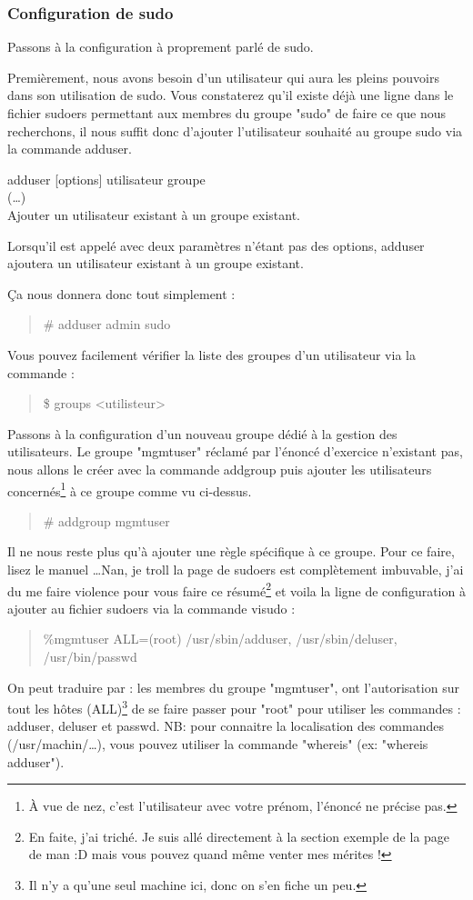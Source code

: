 \documentclass[a4paper,11pt]{article}
\newcommand{\commande}[1] {
    \begin{quote}
    \tt\raggedright #1 
    \end{quote}
}
\newcommand{\man}[2]{
    \begin{tcolorbox}[toprule=3mm,width=\textwidth,outer arc=0mm,colbacktitle=grayman,coltitle=black,colback={grayman},colframe={grayman},title={man : \tt #1}]
        \tt\raggedright #2
    \end{tcolorbox}
}
\newcommand{\mandesc}[1]{
    \begin{adjustwidth}{0.8cm}{}
        #1
    \end{adjustwidth}
}
\begin{document}
\subsubsection{Configuration de sudo}
\par Passons à la configuration à proprement parlé de sudo.
\par Premièrement, nous avons besoin d'un utilisateur qui aura les pleins pouvoirs dans son utilisation de sudo. Vous constaterez qu'il existe déjà une ligne dans le fichier sudoers permettant aux membres du groupe "sudo" de faire ce que nous recherchons, il nous suffit donc d'ajouter l'utilisateur souhaité au groupe sudo via la commande adduser.
\man{adduser}{adduser [options] utilisateur groupe\\
(\dots)\\
Ajouter un utilisateur existant à un groupe existant.
\mandesc{Lorsqu'il est appelé avec deux paramètres n'étant pas des options, adduser ajoutera un utilisateur existant à un groupe existant.}}
\par Ça nous donnera donc tout simplement :
\commande{\# adduser admin sudo}
\par Vous pouvez facilement vérifier la liste des groupes d'un utilisateur via la commande :
\commande{\$ groups <utilisteur>}
\par Passons à la configuration d'un nouveau groupe dédié à la gestion des utilisateurs. Le groupe "mgmtuser" réclamé par l'énoncé d'exercice n'existant pas, nous allons le créer avec la commande addgroup puis ajouter les utilisateurs concernés\footnote{À vue de nez, c'est l'utilisateur avec votre prénom, l'énoncé ne précise pas.} à ce groupe comme vu ci-dessus.
\commande{\# addgroup mgmtuser}
\par Il ne nous reste plus qu'à ajouter une règle spécifique à ce groupe. Pour ce faire, lisez le manuel \dots Nan, je troll la page de sudoers est complètement imbuvable, j'ai du me faire violence pour vous faire ce résumé\footnote{En faite, j'ai triché. Je suis allé directement à la section exemple de la page de man :D mais vous pouvez quand même venter mes mérites !} et voila la ligne de configuration à ajouter au fichier sudoers via la commande visudo :
\commande{\%mgmtuser ALL=(root) /usr/sbin/adduser, /usr/sbin/deluser, /usr/bin/passwd}
\par On peut traduire par : les membres du groupe "mgmtuser", ont l'autorisation sur tout les hôtes (ALL)\footnote{Il n'y a qu'une seul machine ici, donc on s'en fiche un peu.} de se faire passer pour "root" pour utiliser les commandes : adduser, deluser et passwd. NB: pour connaitre la localisation des commandes (/usr/machin/\dots), vous pouvez utiliser la commande "whereis" (ex: "whereis adduser").
\end{document}
